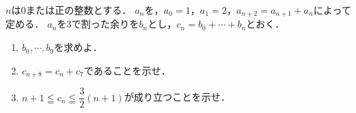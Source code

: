 \documentclass[../../main.tex]{subfiles}
\begin{document}
$n$は0または正の整数とする．
$a_n$を，$a_0=1$，$a_1=2$，$a_{n+2}=a_{n+1}+a_n$によって定める．
$a_n$を3で割った余りを$b_n$とし，$c_n=b_0+\cdots+b_n$とおく．
\begin{enumerate}
  \item $b_0,\cdots,b_9$を求めよ．
  \item $c_{n+8}=c_n+c_7$であることを示せ．
  \item $\displaystyle n+1 \leqq c_n \leqq \dfrac{3}{2}(n+1)$が成り立つことを示せ．
\end{enumerate}
\end{document}
